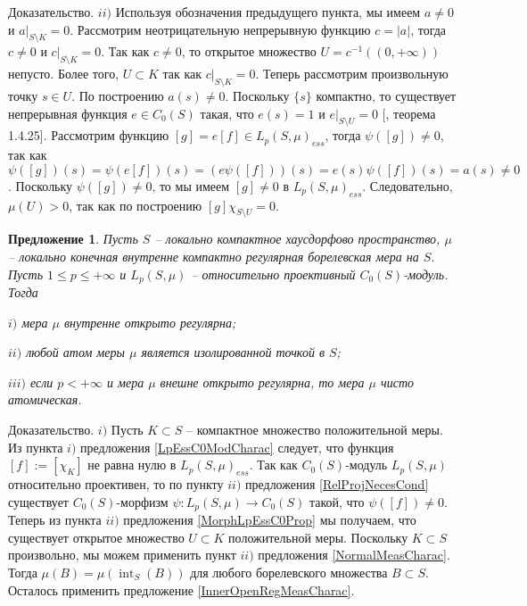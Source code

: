 \documentclass[12pt]{article}
\numberwithin{equation}{subsection}
\theoremstyle{plain}
\newtheorem{proposition}{Предложение}
\newenvironment{proof}{Доказательство.}{}
\begin{document}
\begin{fulltext}
\begin{proof}
        $ii)$ Используя обозначения предыдущего пункта, мы имеем $a\neq 0$ и $a|_{S\setminus K}=0$. Рассмотрим неотрицательную непрерывную функцию $c=|a|$, тогда $c\neq 0$ и $c|_{S\setminus K}=0$. Так как $c\neq 0$, то открытое множество $U=c^{-1}((0, +\infty))$ непусто. Более того, $U\subset K$ так как $c|_{S\setminus K}=0$. Теперь рассмотрим произвольную точку $s\in U$. По построению $a(s)\neq 0$. Поскольку $\{s\}$ компактно, то существует непрерывная функция $e\in C_0(S)$ такая, что $e(s)=1$ и $e|_{S\setminus U}=0$ [\cite{DalesBanSpContFunDualSp}, теорема 1.4.25]. Рассмотрим функцию $[g]=e[f]\in L_p(S,\mu)_{ess}$, тогда $\psi([g])\neq 0$, так как $\psi([g])(s)=\psi(e[f])(s)=(e\psi([f]))(s)=e(s)\psi([f])(s)=a(s)\neq 0$. Поскольку $\psi([g])\neq 0$, то мы имеем $[g]\neq 0$ в $L_p(S,\mu)_{ess}$. Следовательно, $\mu(U)>0$, так как по построению $[g]\chi_{S\setminus U}=0$.
    \end{proof}

    \begin{proposition}\label{LpC0ModNecessCond}  Пусть $S$ -- локально компактное хаусдорфово пространст\-во, $\mu$ -- локально конечная внутренне компактно регулярная борелевская мера на $S$. Пусть $1\leq p\leq +\infty$ и $L_p(S,\mu)$ -- относительно проективный $C_0(S)$-модуль. Тогда

        $i)$ мера $\mu$ внутренне открыто регулярна;

        $ii)$ любой атом меры $\mu$ является изолированной точкой в $S$;

        $iii)$ если $p<+\infty$ и мера $\mu$ внешне открыто регулярна, то мера $\mu$ чисто атомическая.
    \end{proposition}
    \begin{proof} $i)$ Пусть $K\subset S$ -- компактное множество положительной меры. Из пункта $i)$ предложения \ref{LpEssC0ModCharac} следует, что функция $[f]:=[\chi_K]$ не равна нулю в $L_p(S,\mu)_{ess}$. Так как $C_0(S)$-модуль $L_p(S,\mu)$ относительно проективен, то по пункту $ii)$ предложения \ref{RelProjNecesCond} существует $C_0(S)$-морфизм $\psi:L_p(S,\mu)\to C_0(S)$ такой, что $\psi([f])\neq 0$. Теперь из пункта $ii)$ предложения \ref{MorphLpEssC0Prop} мы получаем, что существует открытое множество $U\subset K$ положительной меры. Поскольку $K\subset S$ произвольно, мы можем применить пункт $ii)$ предложения \ref{NormalMeasCharac}. Тогда $\mu(B)=\mu(\operatorname{int}_S(B))$ для любого борелевского множества $B\subset S$. Осталось применить предложение \ref{InnerOpenRegMeasCharac}.


\end{proof}
\end{fulltext}
\end{document}

